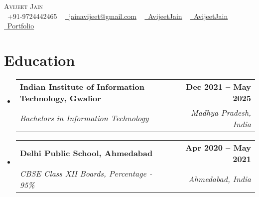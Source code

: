 \documentclass[letterpaper,11pt]{article}
\makeatletter
\newcommand{\resumeSubheading}[4]{
  \vspace{-2pt}\item
    \begin{tabular*}{1.0\textwidth}[t]{l@{\extracolsep{\fill}}r}
      \textbf{#1} & \textbf{\small #2} \\
      \textit{\small#3} & \textit{\small #4} \\
    \end{tabular*}\vspace{-7pt}
}
\newcommand{\resumeSubHeadingListStart}{\begin{itemize}[leftmargin=0.0in, label={}]}
\newcommand{\resumeSubHeadingListEnd}{\end{itemize}}
\makeatother
\begin{document}

\begin{center}
    {\Huge \scshape Avijeet Jain} \\ \vspace{1pt}
    \small \raisebox{-0.1\height}\faPhone\ +91-9724442465 ~ 
    \textcolor{OliveGreen}{\href{mailto:jainavijeet@gmail.com}{\raisebox{-0.2\height}\faEnvelope\  \underline{jainavijeet@gmail.com}}} ~ 
    \textcolor{OliveGreen}{\href{https://www.linkedin.com/in/avijeetjain/}{\raisebox{-0.2\height}\faLinkedin\ \underline{AvijeetJain}}}  ~
    \textcolor{OliveGreen}{\href{https://github.com/AvijeetJain}{\raisebox{-0.2\height}\faGithub\ \underline{AvijeetJain}}}  ~
    \textcolor{OliveGreen}{\href{https://portfolio-website-isgr.vercel.app/}{\raisebox{-0.2\height}\faGlobe\ \underline{Portfolio}}}
    \vspace{-8pt}
\end{center}


\section{Education}
  \resumeSubHeadingListStart
    \resumeSubheading
      {Indian Institute of Information Technology, Gwalior}{Dec 2021 -- May 2025}
      {Bachelors in Information Technology}{Madhya Pradesh, India}

    \resumeSubheading
      {Delhi Public School, Ahmedabad}{Apr 2020 -- May 2021}
      {CBSE Class XII Boards, Percentage - 95\%}{Ahmedabad, India}
  \resumeSubHeadingListEnd

\end{document}
